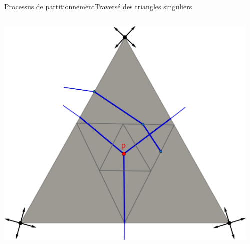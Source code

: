 \documentclass[compress,10pt,aspectratio=169]{beamer}
\begin{document}
\begin{frame}{Processus de partitionnement}{Traversé des triangles singuliers}
\begin{columns}
\begin{column}{0.7\textwidth}
{\includegraphics[scale=0.106]{images/draw_streams_sing_3.pdf}
}
\vspace{0.35cm}
\end{column}
\begin{column}{0.7\textwidth}
\centering
{}
\end{column}
\end{columns}
\end{frame}
\end{document}
